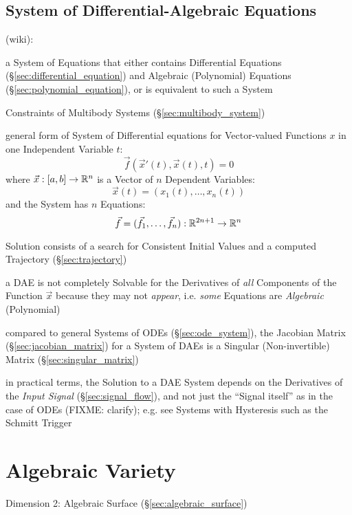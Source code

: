\subsection{System of Differential-Algebraic Equations}\label{sec:dae_system}

(wiki):

a System of Equations that either contains Differential Equations
(\S\ref{sec:differential_equation}) and Algebraic (Polynomial) Equations
(\S\ref{sec:polynomial_equation}), or is equivalent to such a System

\fist Constraints of Multibody Systems (\S\ref{sec:multibody_system})

general form of System of Differential equations for Vector-valued Functions
$x$ in one Independent Variable $t$:
\[
  \vec{f}(\vec{x}'(t), \vec{x}(t), t) = 0
\]
where $\vec{x} : [a,b] \rightarrow \mathbb{R}^n$ is a Vector of $n$ Dependent
Variables:
\[
  \vec{x}(t) = (x_1(t), \ldots, x_n(t))
\]
and the System has $n$ Equations:
\[
  \vec{f} = (\vec{f}_1, \ldots, \vec{f}_n) : \mathbb{R}^{2n+1} \rightarrow \mathbb{R}^n
\]

Solution consists of a search for Consistent Initial Values and a computed
Trajectory (\S\ref{sec:trajectory})

a DAE is not completely Solvable for the Derivatives of \emph{all} Components
of the Function $\vec{x}$ because they may not \emph{appear}, i.e. \emph{some}
Equations are \emph{Algebraic} (Polynomial)

compared to general Systems of ODEs (\S\ref{sec:ode_system}), the Jacobian
Matrix (\S\ref{sec:jacobian_matrix}) for a System of DAEs is a Singular
(Non-invertible) Matrix (\S\ref{sec:singular_matrix})

in practical terms, the Solution to a DAE System depends on the Derivatives of
the \emph{Input Signal} (\S\ref{sec:signal_flow}), and not just the ``Signal
itself'' as in the case of ODEs
(FIXME: clarify); e.g. see Systems with Hysteresis such as the Schmitt Trigger



\section{Algebraic Variety}\label{sec:algebraic_variety}

Dimension 2: Algebraic Surface (\S\ref{sec:algebraic_surface})

